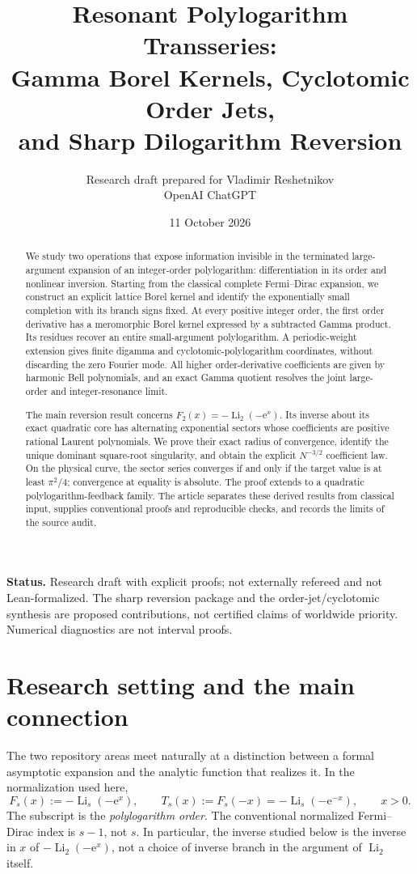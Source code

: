 \documentclass[11pt,a4paper]{article}
\title{Resonant Polylogarithm Transseries:\\Gamma Borel Kernels, Cyclotomic Order Jets,\\and Sharp Dilogarithm Reversion}
\author{Research draft prepared for Vladimir Reshetnikov\\\small OpenAI ChatGPT}
\date{11 October 2026}
\theoremstyle{definition}\newtheorem{definition}[theorem]{Definition}
\theoremstyle{remark}\newtheorem{remark}[theorem]{Remark}
\newcommand{\Li}{\operatorname{Li}}
\newcommand{\ee}{\mathrm e}
\numberwithin{equation}{section}
\begin{document}
\maketitle
\begin{abstract}
We study two operations that expose information invisible in the terminated
large-argument expansion of an integer-order polylogarithm: differentiation
in its order and nonlinear inversion. Starting from the classical complete
Fermi--Dirac expansion, we construct an explicit lattice Borel kernel and
identify the exponentially small completion with its branch signs fixed.
At every positive integer order, the first order derivative has a meromorphic
Borel kernel expressed by a subtracted Gamma product. Its residues recover an
entire small-argument polylogarithm. A periodic-weight extension gives finite
digamma and cyclotomic-polylogarithm coordinates, without discarding the zero
Fourier mode. All higher order-derivative coefficients are given by harmonic
Bell polynomials, and an exact Gamma quotient resolves the joint large-order
and integer-resonance limit.

The main reversion result concerns $F_2(x)=-\Li_2(-\ee^x)$. Its inverse about
its exact quadratic core has alternating exponential sectors whose
coefficients are positive rational Laurent polynomials. We prove their exact
radius of convergence, identify the unique dominant square-root singularity,
and obtain the explicit $N^{-3/2}$ coefficient law. On the physical curve,
the sector series converges if and only if the target value is at least
$\pi^2/4$; convergence at equality is absolute. The proof extends to a
quadratic polylogarithm-feedback family. The article separates these
derived results from classical input, supplies conventional proofs and
reproducible checks, and records the limits of the source audit.
\end{abstract}
\medskip
\noindent\textbf{Status.} Research draft with explicit proofs; not externally
refereed and not Lean-formalized. The sharp reversion package and the
order-jet/cyclotomic synthesis are proposed contributions, not certified
claims of worldwide priority. Numerical diagnostics are not interval proofs.
\newpage
\tableofcontents
\newpage

\section{Research setting and the main connection}\label{sec:introduction}

The two repository areas meet naturally at a distinction between a formal
asymptotic expansion and the analytic function that realizes it. In the
normalization used here,
\begin{equation}\label{eq:Fdef}
 F_s(x):=-\Li_s(-\ee^x),\qquad
 T_s(x):=F_s(-x)=-\Li_s(-\ee^{-x}),\qquad x>0.
\end{equation}
The subscript is the \emph{polylogarithm order}. The conventional normalized
Fermi--Dirac index is $s-1$, not $s$. In particular, the inverse studied below
is the inverse in $x$ of $-\Li_2(-\ee^x)$, not a choice of inverse branch in
the argument of $\Li_2$ itself.
\end{document}
